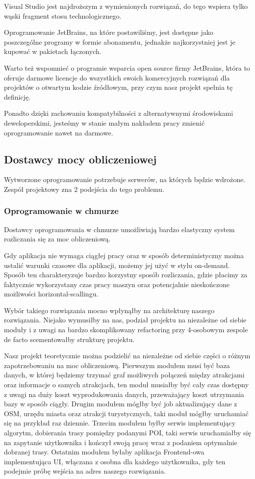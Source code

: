 Visual Studio jest najdroższym z wymienionych rozwiązań, do tego wspiera tylko wąski fragment stosu technologicznego.

Oprogramowanie JetBrains, na które postawiliśmy, jest dostępne jako poszczególne programy w formie abonamentu, jednakże najkorzystniej jest je kupować w pakietach łączonych.

Warto też wspomnieć o programie wsparcia open source firmy JetBrains, która to oferuje darmowe licencje do wszystkich swoich komercyjnych rozwiązań dla projektów o otwartym kodzie źródłowym, przy czym nasz projekt spełnia tę definicję.

Ponadto dzięki zachowaniu kompatybilności z alternatywnymi środowiskami deweloperskimi, jesteśmy w stanie małym nakładem pracy zmienić oprogramowanie nawet na darmowe.

\subsection{Dostawcy mocy obliczeniowej}
\label{subsec:dostawcy-mocy-obliczeniowej}
Wytworzone oprogramowanie potrzebuje serwerów, na których będzie wdrożone.
Zespół projektowy zna 2 podejścia do tego problemu.

\subsubsection{Oprogramowanie w chmurze}
Dostawcy oprogramowania w chmurze umożliwiają bardzo elastyczny system rozliczania się za moc obliczeniową.

Gdy aplikacja nie wymaga ciągłej pracy oraz w sposób deterministyczny można ustalić warunki czasowe dla aplikacji, możemy jej użyć w stylu \gls{on-demand}.
Sposób ten charakteryzuje bardzo korzystny sposób rozliczania, gdzie płacimy za faktycznie wykorzystany czas pracy maszyn oraz potencjalnie nieskończone możliwości horizontal-scallingu.

Wybór takiego rozwiązania mocno wpłynąłby na architekturę naszego rozwiązania.
Niejako wymusiłby na nas, podział projektu na niezależne od siebie moduły i z uwagi na bardzo skomplikowany \gls{refactoring} przy 4-osobowym zespole de facto scementowałby strukturę projektu.

Nasz projekt teoretycznie można podzielić na niezależne od siebie części o różnym zapotrzebowaniu na moc obliczeniową.
Pierwszym modułem musi być baza danych, w której będziemy trzymać graf możliwych połączeń między atrakcjami oraz informacje o samych atrakcjach, ten moduł musiałby być cały czas dostępny z uwagi na duży koszt wyprodukowania danych, przeważający koszt utrzymania bazy w sposób ciągły.
Drugim modułem mógłby być \gls{job} aktualizujący dane z OSM, urzędu miasta oraz atrakcji turystycznych, taki moduł mógłby uruchamiać się na przykład raz dziennie.
Trzecim modułem byłby serwis implementujący algorytm, dobierania trasy pomiędzy podanymi POI, taki serwis uruchamiałby się na zapytanie użytkownika i kończył swoją pracę wraz z podaniem optymalnie dobranej trasy.
Ostatnim modułem byłaby aplikacja \gls{Frontend}-owa implementująca UI, włączana z osobna dla każdego użytkownika, gdy ten podejmie próbę wejścia na adres naszego rozwiązania.

